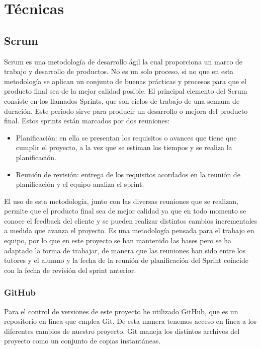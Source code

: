 

\section{Técnicas}

\subsection{Scrum}
Scrum es una metodología de desarrollo ágil la cual proporciona un marco de trabajo y desarrollo de productos. No es un solo proceso, si no que en esta metodología se aplican un conjunto de buenas prácticas y procesos para que el producto final sea de la mejor calidad posible.
El principal elemento del Scrum consiste en los llamados Sprints, que son ciclos de trabajo de una semana de duración. Este periodo sirve para producir un desarrollo o mejora del producto final. Estos sprints están marcados por dos reuniones:
\begin{itemize}
	\item Planificación: en ella se presentan los requisitos o avances que tiene que cumplir el proyecto, a la vez que se estiman los tiempos y se realiza la planificación.
	\item Reunión de revisión: entrega de los requisitos acordados en la reunión de planificación y el equipo analiza el sprint.
\end{itemize}
El uso de esta metodología, junto con las diversas reuniones que se realizan, permite que el producto final sea de mejor calidad ya que en todo momento se conoce el feedback del cliente y se pueden realizar distintos cambios incrementales a medida que avanza el proyecto.
Es una metodología pensada para el trabajo en equipo, por lo que en este proyecto se han mantenido las bases pero se ha adaptado la forma de trabajar, de manera que las reuniones han sido entre los tutores y el alumno y la fecha de la reunión de planificación del Sprint coincide con la fecha de revisión del sprint anterior.


\subsubsection{GitHub}
Para el control de versiones de este proyecto he utilizado GitHub, que es un repositorio en línea que emplea Git. De esta manera tenemos acceso en línea a los diferentes cambios de nuestro proyecto.
Git maneja los distintos archivos del proyecto como un conjunto de copias instantáneas. 


